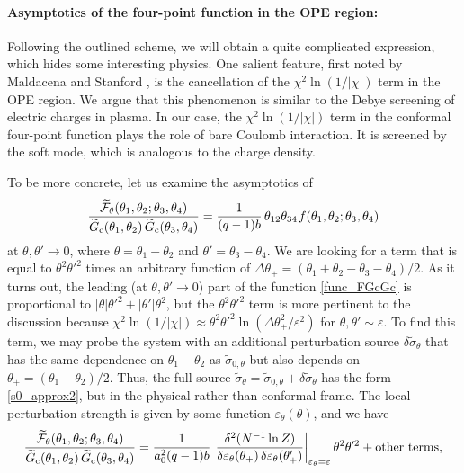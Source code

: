 \documentclass[12pt]{article}
\newcommand{\calF}{\mathcal{F}}
\newcommand{\cc}{\mathrm{c}}
\newcommand{\tG}{\widetilde{G}}
\newcommand{\tF}{\widetilde{\calF}}
\newcommand{\tsig}{\tilde{\sigma}}
\newcommand{\vep}{\varepsilon}
\begin{document}
\paragraph{Asymptotics of the four-point function in the OPE region:}
Following the outlined scheme, we will obtain a quite complicated expression, which hides some interesting physics. One salient feature, first noted by Maldacena and Stanford \cite{MS16}, is the cancellation of the $\chi^2\ln(1/|\chi|)$ term in the OPE region. We argue that this phenomenon is similar to the Debye screening of electric charges in plasma. In our case, the $\chi^2\ln(1/|\chi|)$ term in the conformal four-point function plays the role of bare Coulomb interaction. It is screened by the soft mode, which is analogous to the charge density.

To be more concrete, let us examine the asymptotics of
\begin{equation}\label{func_FGcGc}
\frac{\tF_{\theta}(\theta_1,\theta_2;\theta_3,\theta_4)}
{\tG_{\cc}(\theta_1,\theta_2)\,\tG_{\cc}(\theta_3,\theta_4)}
=\frac{1}{(q-1)b}\,\theta_{12}\theta_{34}\kern1pt
f(\theta_1,\theta_2;\theta_3,\theta_4)
\end{equation}
at $\theta,\theta'\to 0$, where $\theta=\theta_1-\theta_2$ and $\theta'=\theta_3-\theta_4$. We are looking for a term that is equal to $\theta^2\theta'^2$ times an arbitrary function of $\Delta\theta_{+} =(\theta_1+\theta_2-\theta_3-\theta_4)/2$. As it turns out, the leading (at $\theta,\theta'\to 0$) part of the function \eqref{func_FGcGc} is proportional to $|\theta|\theta'^2+|\theta'|\theta^2$, but the $\theta^2\theta'^2$ term is more pertinent to the discussion because $\chi^2\ln(1/|\chi|)\approx \theta^2\theta'^2 \ln(\Delta\theta_{+}^2/\vep^2)$ for $\theta,\theta'\sim\vep$. To find this term, we may probe the system with an additional perturbation source $\delta\tsig_{\theta}$ that has the same dependence on $\theta_1-\theta_2$ as $\tsig_{0,\theta}$ but also depends on $\theta_{+}=(\theta_1+\theta_2)/2$. Thus, the full source $\tsig_{\theta}=\tsig_{0,\theta}+\delta\tsig_{\theta}$ has the form \eqref{s0_approx2}, but in the physical rather than conformal frame. The local perturbation strength is given by some function $\vep_{\theta}(\theta)$, and we have
\begin{equation}
\frac{\tF_{\theta}(\theta_1,\theta_2;\theta_3,\theta_4)}
{\tG_{\cc}(\theta_1,\theta_2)\,\tG_{\cc}(\theta_3,\theta_4)}
=\frac{1}{a_0^2(q-1)b}\kern1pt
\left.\frac{\delta^2(N^{-1}\ln Z)}
{\delta\vep_\theta(\theta_{+})\,\delta\vep_\theta(\theta'_{+})}\right|
_{\vep_\theta=\vep} \theta^2\theta'^2
+\text{other terms},
\end{equation}
\end{document}

